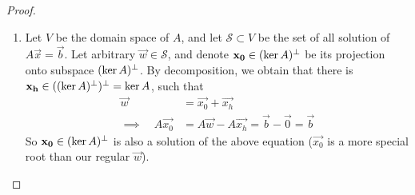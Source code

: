 \documentclass{article}
\begin{document}
\begin{proof}
  \text{}
  \begin{enumerate}[label={(\alph*)}]
    \item 
      Let $V$ be the domain space of $A$, and let $\mathcal S\subset V$
      be the set of all solution of $A\vec{x}=\vec{b}$. 
      Let arbitrary $\vec{w}\in\mathcal S$, and denote 
      $\mathbf{x_0}\in(\ker A)^\perp$ be its projection onto subspace 
      $(\ker A)^\perp$. By decomposition, we obtain that there is 
      $\mathbf{x_h}\in ((\ker A)^\perp)^\perp=\ker A$, such that
      \begin{align*}
        \vec{w}&=\vec{x_0}+\vec{x_h} \\ \implies\quad 
        A\vec{x_0}&=A\vec{w}-A\vec{x_h}=\vec{b}-\vec{0}=\vec{b}
      \end{align*}
      So $\mathbf{x_0}\in(\ker A)^\perp$ is also a solution of the above 
      equation ($\vec{x_0}$ is a more special root than our 
      regular $\vec{w}$). 


\end{enumerate}
\end{proof}
\end{document}
